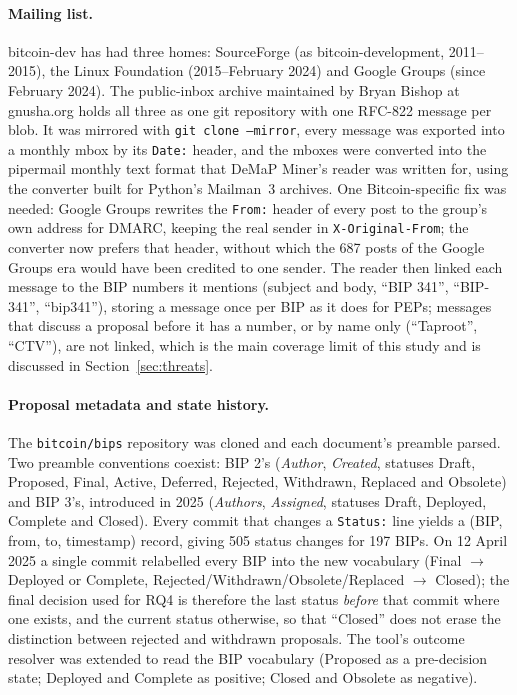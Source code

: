 \paragraph{Mailing list.} bitcoin-dev has had three homes: SourceForge (as bitcoin-development, 2011--2015), the Linux Foundation (2015--February 2024) and Google Groups (since February 2024). The public-inbox archive maintained by Bryan Bishop at gnusha.org \cite{gnusha} holds all three as one git repository with one RFC-822 message per blob. It was mirrored with \texttt{git clone --mirror}, every message was exported into a monthly mbox by its \texttt{Date:} header, and the mboxes were converted into the pipermail monthly text format that DeMaP Miner's reader was written for, using the converter built for Python's Mailman~3 archives. One Bitcoin-specific fix was needed: Google Groups rewrites the \texttt{From:} header of every post to the group's own address for DMARC, keeping the real sender in \texttt{X-Original-From}; the converter now prefers that header, without which the 687 posts of the Google Groups era would have been credited to one sender. The reader then linked each message to the BIP numbers it mentions (subject and body, ``BIP 341'', ``BIP-341'', ``bip341''), storing a message once per BIP as it does for PEPs; messages that discuss a proposal before it has a number, or by name only (``Taproot'', ``CTV''), are not linked, which is the main coverage limit of this study and is discussed in Section~\ref{sec:threats}.

\paragraph{Proposal metadata and state history.} The \texttt{bitcoin/bips} repository was cloned and each document's preamble parsed. Two preamble conventions coexist: BIP 2's (\emph{Author}, \emph{Created}, statuses Draft, Proposed, Final, Active, Deferred, Rejected, Withdrawn, Replaced and Obsolete) and BIP 3's, introduced in 2025 (\emph{Authors}, \emph{Assigned}, statuses Draft, Deployed, Complete and Closed). Every commit that changes a \texttt{Status:} line yields a (BIP, from, to, timestamp) record, giving 505 status changes for 197 BIPs. On 12 April 2025 a single commit relabelled every BIP into the new vocabulary (Final $\to$ Deployed or Complete, Rejected/Withdrawn/Obsolete/Replaced $\to$ Closed); the final decision used for RQ4 is therefore the last status \emph{before} that commit where one exists, and the current status otherwise, so that ``Closed'' does not erase the distinction between rejected and withdrawn proposals. The tool's outcome resolver was extended to read the BIP vocabulary (Proposed as a pre-decision state; Deployed and Complete as positive; Closed and Obsolete as negative).

